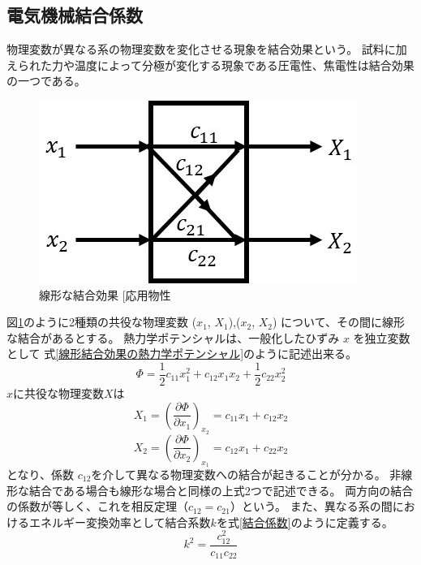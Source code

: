 \documentclass[dvipdfmx,12pt,a4paper]{jreport}
\makeatletter
\DeclareRobustCommand\cite{\unskip
    	\@ifnextchar[{\@tempswatrue\@citex}{\@tempswafalse\@citex[]}}
\makeatother
\begin{document}
			\subsection{電気機械結合係数}
			物理変数が異なる系の物理変数を変化させる現象を結合効果という。
			試料に加えられた力や温度によって分極が変化する現象である圧電性、焦電性は結合効果の一つである。
			\begin{figure}[h]
				\centering
				\includegraphics{結合効果.jpg}
				\caption{線形な結合効果\cite{応用物性}}
				\label{結合効果}
			\end{figure}

			図\ref{結合効果}のように2種類の共役な物理変数 ($x_1$, $X_1$),($x_2$, $X_2$)
			について、その間に線形な結合があるとする。
			熱力学ポテンシャルは、一般化したひずみ $x$ を独立変数として
			式\ref{線形結合効果の熱力学ポテンシャル}のように記述出来る。
			\begin{equation}
				\Phi=\frac{1}{2}c_{11}x_1^2 + c_{12}x_1x_2+\frac{1}{2}c_{22}x_2^2
				\label{線形結合効果の熱力学ポテンシャル}
			\end{equation}
			$x$に共役な物理変数$X$は
			\begin{equation}
				X_1 = \left( \frac{\partial \Phi}{\partial x_1} \right)_{x_2} = c_{11}x_1+c_{12}x_2
			\end{equation}
			\begin{equation}
				X_2 = \left( \frac{\partial \Phi}{\partial x_2} \right)_{x_1} = c_{12}x_1 + c_{22}x_2
			\end{equation}
			となり、係数 $c_{12}$を介して異なる物理変数への結合が起きることが分かる。
			非線形な結合である場合も線形な場合と同様の上式2つで記述できる。
			両方向の結合の係数が等しく、これを相反定理（$c_{12}=c_{21}$）という。
			また、異なる系の間におけるエネルギー変換効率として結合系数$k$を式\ref{結合係数}のように定義する。
			\begin{equation}
				k^2=\frac{c_{12}^2}{c_{11}c_{22}}
				\label{結合係数}
			\end{equation}
			
\end{document}
